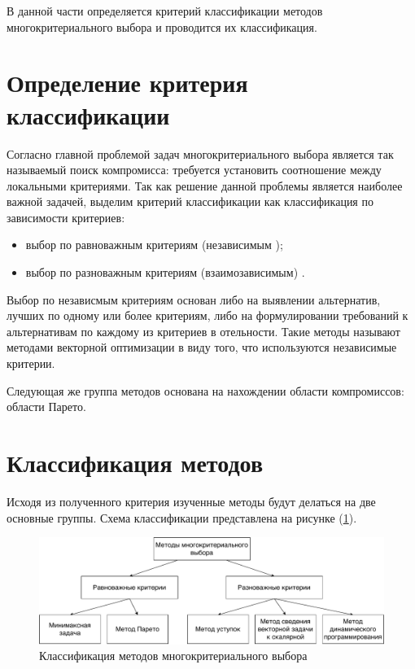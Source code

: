 В данной части определяется критерий классификации методов многокритериального выбора и проводится их классификация.

\section{Определение критерия классификации}

\par Согласно \cite{bib8} главной проблемой задач многокритериального выбора является так называемый поиск компромисса: требуется установить соотношение между локальными критериями. Так как решение данной проблемы является наиболее важной задачей, выделим критерий классификации как классификация по зависимости критериев:
\begin{itemize}[label=--]
    \item выбор по равноважным критериям (независимым );
    \item выбор по разноважным критериям (взаимозависимым) .
\end{itemize}

\par Выбор по независмым критериям основан либо на выявлении альтернатив, лучших по одному или более критериям, либо на формулировании требований к альтернативам по каждому из критериев в отельности. Такие методы называют методами векторной оптимизации в виду того, что используются независимые критерии.
\par Следующая же группа методов основана на нахождении области компромиссов: области Парето.
\section{Классификация методов}
\par Исходя из полученного критерия изученные методы будут делаться на две основные группы. Схема классификации представлена на рисунке (\ref{img:class}).
\newpage
\begin{figure}[h!]
    \centering
    \includegraphics[scale=0.6]{img/class.pdf}
    \caption{Классификация методов многокритериального выбора}
    \label{img:class}
\end{figure}

